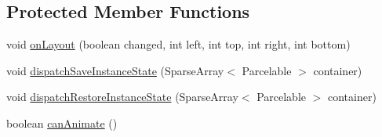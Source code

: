 \subsection*{Protected Member Functions}
\begin{DoxyCompactItemize}
\item 
void \hyperlink{classcom_1_1zia_1_1freshdocs_1_1widget_1_1fileexplorer_1_1carousel_1_1_carousel_adapter_3_01_t_01extends_01_adapter_01_4_a31ab3004bea0cea9fcd5e912affd2470}{on\-Layout} (boolean changed, int left, int top, int right, int bottom)
\item 
void \hyperlink{classcom_1_1zia_1_1freshdocs_1_1widget_1_1fileexplorer_1_1carousel_1_1_carousel_adapter_3_01_t_01extends_01_adapter_01_4_a2f3e96e6c13db814e75bfc138f4be5bf}{dispatch\-Save\-Instance\-State} (Sparse\-Array$<$ Parcelable $>$ container)
\item 
void \hyperlink{classcom_1_1zia_1_1freshdocs_1_1widget_1_1fileexplorer_1_1carousel_1_1_carousel_adapter_3_01_t_01extends_01_adapter_01_4_aaf00de3d1f1f8de5bcc6817dd408686d}{dispatch\-Restore\-Instance\-State} (Sparse\-Array$<$ Parcelable $>$ container)
\item 
boolean \hyperlink{classcom_1_1zia_1_1freshdocs_1_1widget_1_1fileexplorer_1_1carousel_1_1_carousel_adapter_3_01_t_01extends_01_adapter_01_4_aefb686669788e572eb35dea6f7c8b0cc}{can\-Animate} ()
\end{DoxyCompactItemize}


